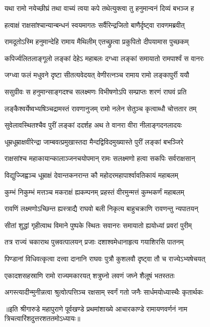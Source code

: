\twolineshloka
{यथा रामो नयेच्छीघ्रं तथा वाच्यं त्वया कपे}
{तथेत्युक्त्वा तु हनुमान्वनं दिव्यं बभञ्ज ह} %

\twolineshloka
{हत्वाक्षं राक्षसांश्चान्यान्बन्धनं स्वयमागतः}
{सर्वैरिन्द्रजितो बाणैर्दृष्ट्वा रावणमब्रवीत्} %

\twolineshloka
{रामदूतोऽस्मि हनुमान्देहि रामाय मैथिलीम्}
{एतच्छ्रुत्वा प्रकुपितो दीपयामास पुच्छकम्} %

\twolineshloka
{कपिर्ज्वलितलाङ्गूलो लङ्कां देहेऽ महाबलः}
{दग्ध्वा लङ्कां समायातो रामपार्श्वं स वानरः} %

\twolineshloka
{जग्ध्वा फलं मधुवने दृष्टा सीतत्यवेदयत्}
{वेणीरत्नञ्च रामाय रामो लङ्कापुर्री ययौ} %

\twolineshloka
{ससुग्रीवः स हनुमान्साङ्गदश्च सलक्ष्मणः}
{विभीषणोऽपि सम्प्राप्तः शरणं राघवं प्रति} %

\twolineshloka
{लङ्कैश्वर्येष्वभ्यषिञ्चद्रामस्तं रावणानुजम्}
{रामो नलेन सेतुञ्च कृत्वाब्धौ चोत्ततार तम्} %

\twolineshloka
{सुवेलावस्थितश्चैव पुरीं लङ्कां ददर्शह}
{अथ ते वानरा वीरा नीलाङ्गदनलादयः} %

\twolineshloka
{धूम्रधूम्राक्षवीरेन्द्रा जाम्बवत्प्रमुखास्तदा}
{मैन्दद्विविदमुख्यास्ते पुरीं लङ्कां बभञ्जिरे} %

\twolineshloka
{राक्षसांश्च महाकायान्कालाञ्जनचयोपमान्}
{रामः सलक्ष्मणो हत्वा सकपिः सर्वराक्षसान्} %

\twolineshloka
{विद्युज्जिह्वञ्च धूम्राक्षं देवान्तकनरान्त कौ}
{महोदरमहापार्श्वावतिकायं महाबलम्} %

\twolineshloka
{कुम्भं निकुम्भं मत्तञ्च मकराक्षं ह्यकम्पनम्}
{प्रहस्तं वीरमुन्मत्तं कुम्भकर्णं महाबलम्} %

\twolineshloka
{रावणिं लक्ष्मणोऽच्छिन्त ह्यस्त्राद्यै राघवो बली}
{निकृत्य बाहुचक्राणि रावणन्तु न्यपातयन्} %

\twolineshloka
{सीतां शुद्धां गृहीत्वाथ विमाने पुष्पके स्थितः}
{सवानरः समायातो ह्ययोध्यां प्रवरां पुरीम्} %

\twolineshloka
{तत्र राज्यं चकाराथ पुत्त्रवत्पालयन् प्रजाः}
{दशाश्वमेधानाहृत्य गयाशिरसि पातनम्} %

\twolineshloka
{पिण्डानां विधिवत्कृत्वा दत्त्वा दानानि राघवः}
{पुत्रौ कुशलवौ दृष्ट्वा तौ च राज्येऽभ्यषेचयत्} %

\twolineshloka
{एकादशसहस्राणि रामो राज्यमकारयत्}
{शत्रुघ्नो लवणं जघ्ने शैलूषं भतस्ततः} %

\twolineshloka
{अगस्त्यादीन्मुनीन्नत्वा श्रुत्वोत्पत्तिञ्च रक्षसाम्}
{स्वर्गं गतो जनैः सार्धमयोध्यास्थैः कृतार्थकः} %

॥इति श्रीगारुडे महापुराणे पूर्वखण्डे प्रथमांशाख्ये आचारकाण्डे रामायणवर्णनं नाम
त्रिचत्वारिंशदुत्तरशततमोऽध्यायः॥